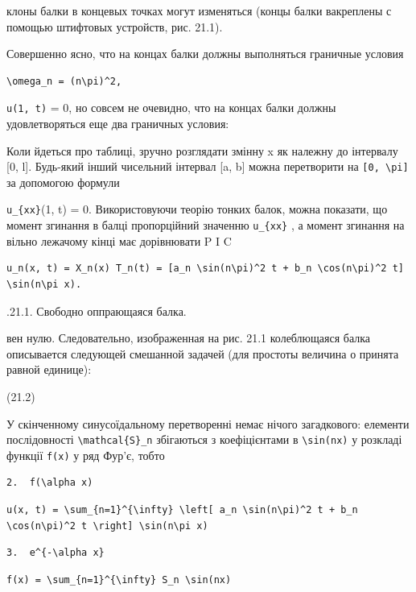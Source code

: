 \documentclass[
  ukrainian,
]{article}
\begin{document}
клоны балки в концевых точках могут изменяться (концы балки вакреплены с
помощью штифтовых устройств, рис. 21.1).

Совершенно ясно, что на концах балки должны выполняться граничные
условия

\begin{verbatim}
\omega_n = (n\pi)^2,
\end{verbatim}

\texttt{u(1,\ t)} = 0, но совсем не очевидно, что на концах балки должны
удовлетворяться еще два граничных условия:

Коли йдеться про таблиці, зручно розглядати змінну x як належну до
інтервалу {[}0, l{]}. Будь-який інший чисельний інтервал {[}a, b{]}
можна перетворити на \texttt{{[}0,\ \textbackslash{}pi{]}} за допомогою
формули

\texttt{u\_\{xx\}}(1, t) = 0. Використовуючи теорію тонких балок, можна
показати, що момент згинання в балці пропорційний значенню
\texttt{u\_\{xx\}} , а момент згинання на вільно лежачому кінці має
дорівнювати P I C

\begin{verbatim}
u_n(x, t) = X_n(x) T_n(t) = [a_n \sin(n\pi)^2 t + b_n \cos(n\pi)^2 t] \sin(n\pi x).
\end{verbatim}

.21.1. Свободно оппрающаяся балка.

вен нулю. Следовательно, изображенная на рис. 21.1 колеблющаяся балка
описывается следующей смешанной задачей (для простоты величина о принята
равной единице):

(21.2)

У скінченному синусоїдальному перетворенні немає нічого загадкового:
елементи послідовності \texttt{\textbackslash{}mathcal\{S\}\_n}
збігаються з коефіцієнтами в \texttt{\textbackslash{}sin(nx)} у розкладі
функції \texttt{f(x)} у ряд Фур'є, тобто

\begin{verbatim}
2.  f(\alpha x) 
\end{verbatim}

\begin{verbatim}
u(x, t) = \sum_{n=1}^{\infty} \left[ a_n \sin(n\pi)^2 t + b_n \cos(n\pi)^2 t \right] \sin(n\pi x)
\end{verbatim}

\begin{verbatim}
3.  e^{-\alpha x} 
\end{verbatim}

\begin{verbatim}
f(x) = \sum_{n=1}^{\infty} S_n \sin(nx)
\end{verbatim}
\end{document}
